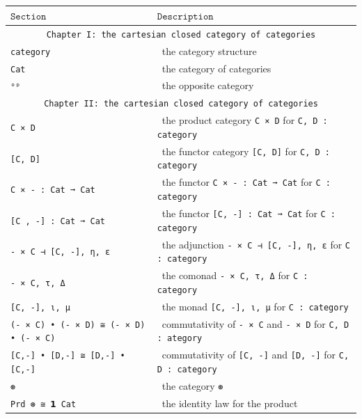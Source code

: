 \documentclass{book}
\newcounter{sectioncount}
\newcounter{subsectioncount}
\renewcommand{\section}[1]{\newpage
\ \\
\ \\
 \begin{center} \scalebox{1.5}{\texttt{\thesectioncount . #1}} \setcounter{sectioncount}{\thesectioncount+1} \setcounter{subsectioncount}{1} \end{center}
 \begin{center}

\ \\
\ \\

\thispagestyle{empty}
\end{center}
}
\begin{document}
\newpage
\section{Contents}

{\small
\begin{center}
\begin{tabular}{|l | l |} 
\hline
$\texttt{Section}$ & $\texttt{Description}$ \\
\hline \hline
\multicolumn{2}{|c|}{\texttt{Chapter I: the cartesian closed category of categories}} \\
\hline \hline
\texttt{category} &\ the category structure\\
\hline
\texttt{Cat} &\ the category of categories\\
\hline
\texttt{ᵒᵖ} &\ the opposite category\\
\hline \hline
\multicolumn{2}{|c|}{\texttt{Chapter II: the cartesian closed category of categories}} \\
\hline \hline
\texttt{C × D} &\ the product category \texttt{C × D} for \texttt{C, D : category} \\
\hline
\texttt{[C, D]} &\ the functor category \texttt{[C, D]} for \texttt{C, D : category} \\
\hline 
\texttt{C × - : Cat ➞ Cat} &\ the functor \texttt{C × - : Cat ➞ Cat} for \texttt{C : category}\\
\hline
\texttt{[C , -] : Cat ➞ Cat} &\ the functor \texttt{[C, -] : Cat ➞ Cat} for \texttt{C : category}  \\ 
\hline
\texttt{- × C ⊣ [C, -], η, ε} &\ the adjunction \texttt{- × C ⊣ [C, -], η, ε} for \texttt{C : category} \\
\hline
\texttt{- × C, τ, Δ} &\ the comonad \texttt{- × C, τ, Δ} for \texttt{C : category}  \\
\hline
\texttt{[C, -], ι, μ} &\ the monad \texttt{[C, -], ι, μ} for \texttt{C : category}  \\
\hline
\texttt{(- × C) • (- × D) ≅ (- × D) • (- × C)} &\ commutativity of \texttt{- × C} and \texttt{- × D} for \texttt{C, D : ategory} \\ 
\hline 
\texttt{[C,-] • [D,-] ≅ [D,-] • [C,-]} &\ commutativity of \texttt{[C, -]} and \texttt{[D, -]} for \texttt{C, D : category} \\
\hline
\texttt{⊛} &\ the category \texttt{⊛} \\
\hline
\texttt{Prd ⊛ ≅ 𝟭 Cat} &\ the identity law for the product \\

\end{tabular}
\end{center}}
\end{document}
